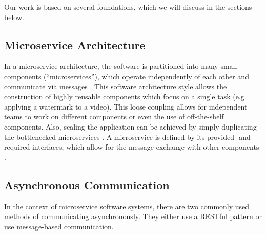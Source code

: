 Our work is based on several foundations, which we will discuss in the sections below.

\subsection{Microservice Architecture}
\label{sec:Foundation:MicroserviceArchitecture}
In a microservice architecture, the software is partitioned into many small components (``microservices''), which operate independently of each other and communicate via messages \cite{Dragoni2017}.
This software architecture style allows the construction of highly reusable components which focus on a single task (e.g. applying a watermark to a video).
This loose coupling allows for independent teams to work on different components or even the use of off-the-shelf components.
Also, scaling the application can be achieved by simply duplicating the bottlenecked microservices \cite{Dragoni2017}.
A microservice is defined by its provided- and required-interfaces, which allow for the message-exchange with other components \cite{Singh2021}.

\subsection{Asynchronous Communication}
\label{sec:Foundation:AsyncCommunication}
In the context of microservice software systems, there are two commonly used methods of communicating asynchronously.
They either use a RESTful pattern or use message-based communication.

